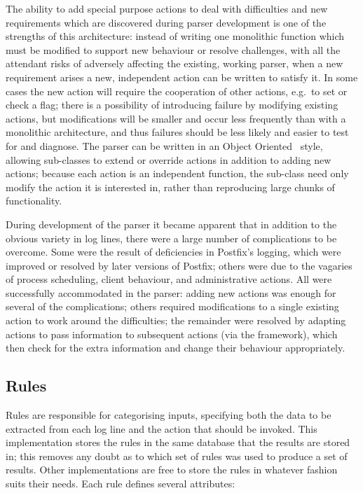 \documentclass[draft]{svmult}
\begin{document}
The ability to add special purpose actions to deal with difficulties and
new requirements which are discovered during parser development is one of
the strengths of this architecture: instead of writing one monolithic
function which must be modified to support new behaviour or resolve
challenges, with all the attendant risks of adversely affecting the
existing, working parser, when a new requirement arises a new, independent
action can be written to satisfy it.  In some cases the new action will
require the cooperation of other actions, e.g.\ to set or check a flag;
there is a possibility of introducing failure by modifying existing
actions, but modifications will be smaller and occur less frequently than
with a monolithic architecture, and thus failures should be less likely and
easier to test for and diagnose.  The parser can be written in an Object
Oriented~\cite{Wikipedia-object-orientation} style, allowing sub-classes to
extend or override actions in addition to adding new actions; because each
action is an independent function, the sub-class need only modify the
action it is interested in, rather than reproducing large chunks of
functionality.

\label{complications}

During development of the parser it became apparent that in addition to the
obvious variety in log lines, there were a large number of complications to
be overcome.  Some were the result of deficiencies in Postfix's logging,
which were improved or resolved by later versions of Postfix; others were
due to the vagaries of process scheduling, client behaviour, and
administrative actions.  All were successfully accommodated in the parser:
adding new actions was enough for several of the complications; others
required modifications to a single existing action to work around the
difficulties; the remainder were resolved by adapting actions to pass
information to subsequent actions (via the framework), which then check for
the extra information and change their behaviour appropriately.


\subsection{Rules}

\label{Rules}

Rules are responsible for categorising inputs, specifying both the data to
be extracted from each log line and the action that should be invoked.
This implementation stores the rules in the same \SQL{} database that the
results are stored in; this removes any doubt as to which set of rules was
used to produce a set of results.  Other implementations are free to store
the rules in whatever fashion suits their needs.  Each rule defines several
attributes:
\end{document}
